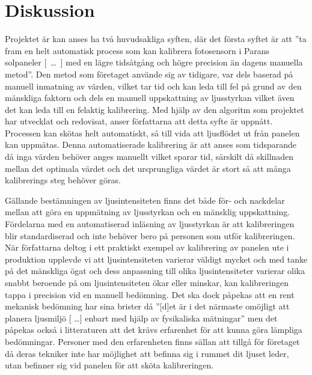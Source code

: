 \section{Diskussion} %
\label{sec:diskussion}

    Projektet är kan anses ha två huvudsakliga syften, där det första syftet är att ''ta fram en helt automatisk process som kan kalibrera fotosensorn i Parans solpaneler [~\dots~] med en lägre tidsåtgång och högre precision än dagens manuella metod''. 
    Den metod som företaget använde sig av tidigare, var dels baserad på manuell inmatning av värden, vilket tar tid och kan leda till fel på grund av den mänskliga faktorn och dels en manuell uppskattning av ljusstyrkan vilket även det kan leda till en felaktig kalibrering. 
    Med hjälp av den algoritm som projektet har utvecklat och redovisat, anser författarna att detta syfte är uppnått. Processen kan skötas helt automatiskt, så till vida att ljusflödet ut från panelen kan uppmätas. 
    Denna automatiserade kalibrering är att anses som tidsparande då inga värden behöver anges manuellt vilket sparar tid, särskilt då skillnaden mellan det optimala värdet och det ursprungliga värdet är stort så att många kalibrerings steg behöver göras. \bigskip

    Gällande bestämningen av ljusintensiteten finns det både för- och nackdelar mellan att göra en uppmätning av ljusstyrkan och en mänsklig uppskattning. Fördelarna med en automatiserad inläsning av ljusstyrkan är att kalibreringen blir standardiserad och inte behöver bero på personen som utför kalibreringen. När författarna deltog i ett praktiskt exempel av kalibrering av panelen ute i produktion upplevde vi att ljusintensiteten varierar väldigt mycket och med tanke på det mänskliga ögat och dess anpassning till olika ljusintensiteter varierar olika snabbt beroende på om ljusintensiteten ökar eller minskar, kan kalibreringen tappa i precision vid en manuell bedömning. \cite[s.~273]{aot} Det ska dock påpekas att en rent mekanisk bedömning har sina brister då ''[d]et är i det närmaste omöjligt att planera ljusmiljö [ \dots ] enbart med hjälp av fysikaliska mätningar'' men det påpekas också i litteraturen att det krävs erfarenhet för att kunna göra lämpliga bedömningar. \cite[s.~278]{aot} Personer med den erfarenheten finns sällan att tillgå för företaget då deras tekniker inte har möjlighet att befinna sig i rummet dit ljuset leder, utan befinner sig vid panelen för att sköta kalibreringen.

